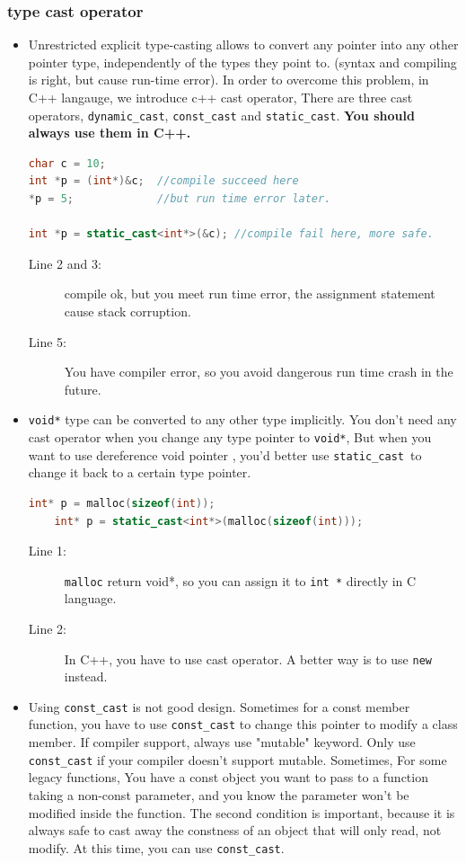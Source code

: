 \documentclass[a4paper,11pt,twoside]{book}
\begin{document}
\subsubsection{type cast operator}
\begin{itemize}
	\item Unrestricted explicit type-casting allows to convert any pointer into any other pointer type, independently of the types they point to.  (syntax and compiling is right, but cause run-time error). In order to overcome this problem,  in C++ langauge, we introduce c++ cast operator, There are three cast operators, \texttt{dynamic\_cast}, \texttt{const\_cast} and \texttt{static\_cast}. \textbf{You should always use them in C++.}
\begin{lstlisting}[frame=single, language=c++]
char c = 10;    
int *p = (int*)&c;  //compile succeed here
*p = 5;             //but run time error later.
	
int *p = static_cast<int*>(&c); //compile fail here, more safe. 
\end{lstlisting}
	\begin{description}
		\item[Line 2 and 3:] compile ok, but you meet run time error, the assignment statement cause stack corruption.
		\item[Line 5:] You have compiler error, so you avoid dangerous run time crash in the future.
	\end{description}
		
	\item \texttt{void*} type can be converted to any other type implicitly. You don't need any cast operator when you change any type pointer to \texttt{void*}, But when you want to use dereference void pointer , you'd better use \texttt{static\_cast }to change it back to a certain type pointer.
\begin{lstlisting}[frame=single, language=c++]
	int* p = malloc(sizeof(int));
	int* p = static_cast<int*>(malloc(sizeof(int)));
\end{lstlisting}		
		\begin{description}
			\item[Line 1:] \texttt{malloc} return void*, so you can assign it to \texttt{int *} directly in C language.
			\item[Line 2:] In C++, you have to use cast operator. A better way is to use \texttt{new} instead.
		\end{description}

	\item Using \texttt{const\_cast} is not good design. Sometimes for a const member function, you have to use \texttt{const\_cast} to change this pointer to modify a class member. If compiler support, always use "mutable"  keyword.  Only use \texttt{const\_cast} if your compiler doesn't support mutable. Sometimes, For some legacy functions, You have a const object you want to pass to a function taking a non-const parameter, and you know the parameter won't be modified inside the function. The second condition is important, because it is always safe to cast away the constness of an object that will only read, not modify. At this time, you can use \texttt{const\_cast}.


\end{itemize}
\end{document}
